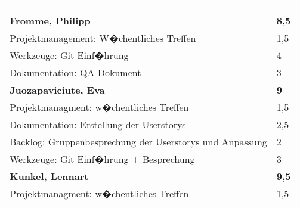 \documentclass[a4paper,11pt]{scrartcl}
\begin{document}
\begin{longtable}{| p{13.8cm} | C{2.4cm} |}
	&

	\\
	\hline


	&

	\\
	\hline


	&

	\\
	\hline
	\hline


	\textbf{Fromme, Philipp} & \textbf{8,5}\\ %
	\hline

	Projektmanagement: W�chentliches Treffen
	&
	1,5
	\\
	\hline

	Werkzeuge: Git Einf�hrung
	&
	4
	\\
	\hline

  Dokumentation: QA Dokument
	&
  3
	\\
	\hline
	\hline


	\textbf{Juozapaviciute, Eva} & \textbf{9}\\ %
	\hline

  Projektmanagment: w�chentliches Treffen
	&
  1,5
	\\
	\hline

  Dokumentation: Erstellung der Userstorys
	&
  2,5
	\\
	\hline

  Backlog: Gruppenbesprechung der Userstorys und Anpassung
	&
  2
	\\
	\hline

  Werkzeuge: Git Einf�hrung + Besprechung
	&
  3
	\\
	\hline
	\hline


	\textbf{Kunkel, Lennart} & \textbf{9,5}\\ %
	\hline

  Projektmanagment: w�chentliches Treffen
	&
  1,5
	\\
	\hline


\end{longtable}
\end{document}
